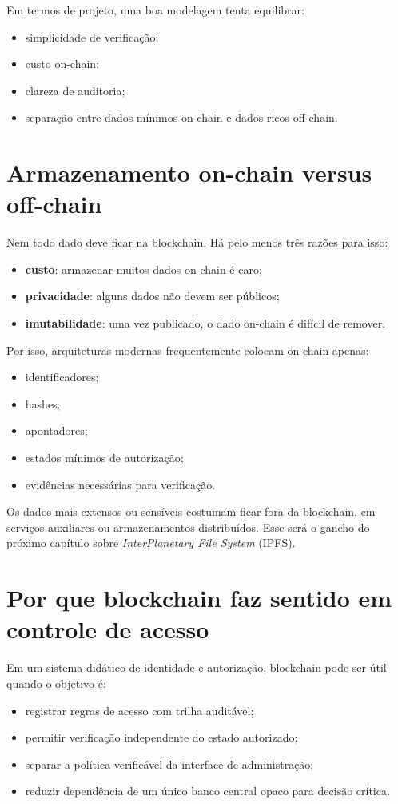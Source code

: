 Em termos de projeto, uma boa modelagem tenta equilibrar:
\begin{itemize}[leftmargin=*]
  \item simplicidade de verificação;
  \item custo on-chain;
  \item clareza de auditoria;
  \item separação entre dados mínimos on-chain e dados ricos off-chain.
\end{itemize}

\section{Armazenamento on-chain versus off-chain}
Nem todo dado deve ficar na blockchain. Há pelo menos três razões para isso:
\begin{itemize}[leftmargin=*]
  \item \textbf{custo}: armazenar muitos dados on-chain é caro;
  \item \textbf{privacidade}: alguns dados não devem ser públicos;
  \item \textbf{imutabilidade}: uma vez publicado, o dado on-chain é difícil de remover.
\end{itemize}

Por isso, arquiteturas modernas frequentemente colocam on-chain apenas:
\begin{itemize}[leftmargin=*]
  \item identificadores;
  \item hashes;
  \item apontadores;
  \item estados mínimos de autorização;
  \item evidências necessárias para verificação.
\end{itemize}

Os dados mais extensos ou sensíveis costumam ficar fora da blockchain, em serviços auxiliares ou armazenamentos distribuídos. Esse será o gancho do próximo capítulo sobre \textit{InterPlanetary File System} (IPFS).

\section{Por que blockchain faz sentido em controle de acesso}
Em um sistema didático de identidade e autorização, blockchain pode ser útil quando o objetivo é:
\begin{itemize}[leftmargin=*]
  \item registrar regras de acesso com trilha auditável;
  \item permitir verificação independente do estado autorizado;
  \item separar a política verificável da interface de administração;
  \item reduzir dependência de um único banco central opaco para decisão crítica.
\end{itemize}

